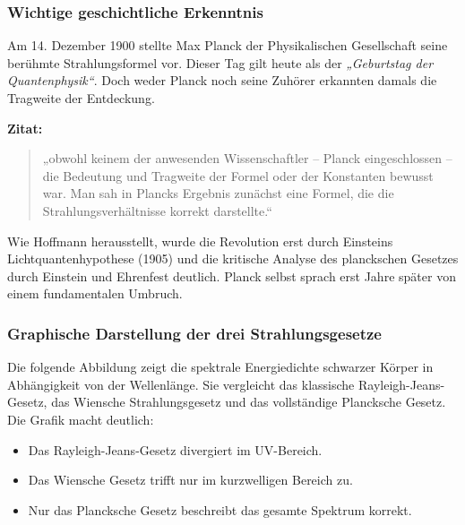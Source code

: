 \subsubsection{Wichtige geschichtliche Erkenntnis}
\vspace{1em}
\begin{tcolorbox}[didaktikbox,title=Wichtige geschichtliche Erkenntnis {\cite{Hoffmann2008}}]
	\label{box:geschichte-planck}
	Am 14. Dezember 1900 stellte Max Planck der Physikalischen Gesellschaft seine berühmte Strahlungsformel vor. Dieser Tag gilt heute als der \textit{„Geburtstag der Quantenphysik“}. Doch weder Planck noch seine Zuhörer erkannten damals die Tragweite der Entdeckung.
	
	\medskip
	
	\textbf{Zitat:} 
	\begin{quote}
		„obwohl keinem der anwesenden Wissenschaftler – Planck eingeschlossen – die Bedeutung und Tragweite der Formel oder der Konstanten bewusst war. Man sah in Plancks Ergebnis zunächst eine Formel, die die Strahlungsverhältnisse korrekt darstellte.“
	\end{quote}
	
	Wie Hoffmann herausstellt, wurde die Revolution erst durch Einsteins Lichtquantenhypothese (1905) und die kritische Analyse des planckschen Gesetzes durch Einstein und Ehrenfest deutlich. Planck selbst sprach erst Jahre später von einem fundamentalen Umbruch.
\end{tcolorbox}

\subsubsection{Graphische Darstellung der drei Strahlungsgesetze}

Die folgende Abbildung zeigt die spektrale Energiedichte schwarzer Körper in Abhängigkeit von der Wellenlänge. Sie vergleicht das klassische Rayleigh-Jeans-Gesetz, das Wiensche Strahlungsgesetz und das vollständige Plancksche Gesetz. Die Grafik macht deutlich:

\begin{itemize}
	\item Das Rayleigh-Jeans-Gesetz divergiert im UV-Bereich.
	\item Das Wiensche Gesetz trifft nur im kurzwelligen Bereich zu.
	\item Nur das Plancksche Gesetz beschreibt das gesamte Spektrum korrekt.
\end{itemize}

